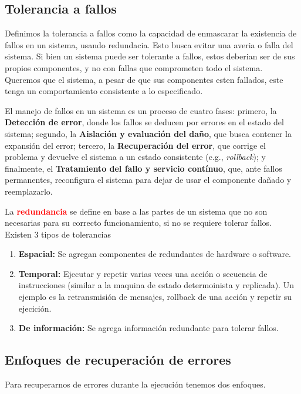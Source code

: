 \subsection{Tolerancia a fallos}
Definimos la tolerancia a fallos como la capacidad de enmascarar la existencia de fallos en un sistema, usando redundacia. Esto busca evitar una averia o falla del sistema. Si bien un sistema puede ser tolerante a fallos, estos deberian ser de sus propios componentes, y no con fallas que comprometen todo el sistema. Queremos que el sistema, a pesar de que sus componentes esten fallados, este tenga un comportamiento consistente a lo especificado.
\vspace{1mm}

El manejo de fallos en un sistema es un proceso de cuatro fases: primero, la \textbf{Detección de error}, donde los fallos se deducen por errores en el estado del sistema; segundo, la \textbf{Aislación y evaluación del daño}, que busca contener la expansión del error; tercero, la \textbf{Recuperación del error}, que corrige el problema y devuelve el sistema a un estado consistente (e.g., \textit{rollback}); y finalmente, el \textbf{Tratamiento del fallo y servicio contínuo}, que, ante fallos permanentes, reconfigura el sistema para dejar de usar el componente dañado y reemplazarlo.

La \textcolor{red}{\textbf{redundancia}} se define en base a las partes de un sistema que no son necesarias para su correcto funcionamiento, si no se requiere tolerar fallos. Existen 3 tipos de tolerancias
\begin{enumerate}
    \item \textbf{Espacial:} Se agregan componentes de redundantes de hardware o software.
    \item \textbf{Temporal:} Ejecutar y repetir varias veces una acción o secuencia de instrucciones (similar a la maquina de estado determoinista y replicada). Un ejemplo es la retransmisión de mensajes, rollback de una acción y repetir su ejecición.
    \item \textbf{De información:} Se agrega información redundante para tolerar fallos.
\end{enumerate} 

\subsection{Enfoques de recuperación de errores}
Para recuperarnos de errores durante la ejecución tenemos dos enfoques.

